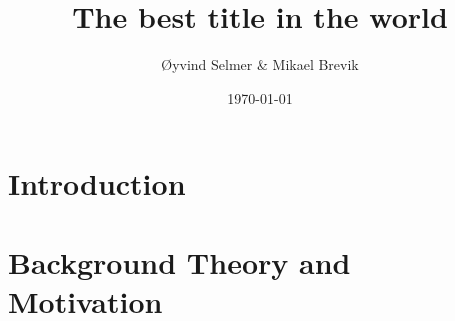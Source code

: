 \documentclass[a4paper, 11pt]{report}
\title{The best title in the world}
\author{Øyvind Selmer \& Mikael Brevik}
\date{\today}
\begin{document}
\maketitle

\tableofcontents

\listoffigures



\chapter{Introduction}


\chapter{Background Theory and Motivation}





\end{document}
